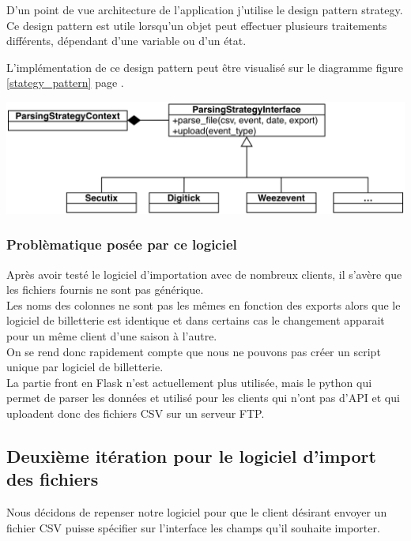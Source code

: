 D'un point de vue architecture de l'application j'utilise le design pattern strategy. Ce design pattern est utile lorsqu'un objet peut effectuer plusieurs traitements différents, dépendant d'une variable ou d'un état.

L'implémentation de ce design pattern peut être visualisé sur le diagramme figure \ref{stategy_pattern} page \pageref{dict_csv}.

\begin{center}
\includegraphics[scale=0.75]{Images/StrategyPattern.png}
\label{stategy_pattern}
\end{center}


\subsubsection{Problèmatique posée par ce logiciel}
Après avoir testé le logiciel d'importation avec de nombreux clients, il s'avère que les fichiers fournis ne sont pas générique. \\
Les noms des colonnes ne sont pas les mêmes en fonction des exports alors que le logiciel de billetterie est identique et dans certains cas le changement apparait pour un même client d'une saison à l'autre. \\
On se rend donc rapidement compte que nous ne pouvons pas créer un script unique par logiciel de billetterie.
\\

La partie front en Flask n'est actuellement plus utilisée, mais le python qui permet de parser les données et utilisé pour les clients qui n'ont pas d'API et qui uploadent donc des fichiers CSV sur un serveur FTP. 


\subsection{Deuxième itération pour le logiciel d'import des fichiers}
Nous décidons de repenser notre logiciel pour que le client désirant envoyer un fichier CSV puisse spécifier sur l'interface les champs qu'il souhaite importer.

